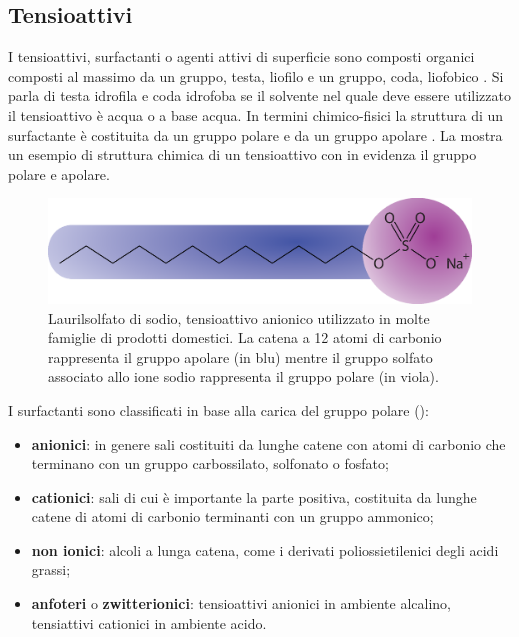 \subsection{Tensioattivi}
I tensioattivi, surfactanti o agenti attivi di superficie sono composti organici composti al massimo da un gruppo, testa, liofilo e un gruppo, coda, liofobico . Si parla di testa idrofila e coda idrofoba se il solvente nel quale deve essere utilizzato il tensioattivo è acqua o a base acqua. In termini chimico-fisici la struttura di un surfactante è costituita da un gruppo polare e da un gruppo apolare . La  mostra un esempio di struttura chimica di un tensioattivo con in evidenza il gruppo polare e apolare.

\begin{figure}[htbp]
    \centering
    \includegraphics[width=.8\textwidth]{fig/foamer/sls.eps}
    \caption{Laurilsolfato di sodio, tensioattivo anionico utilizzato in molte famiglie di prodotti domestici. La catena a 12 atomi di carbonio rappresenta il gruppo apolare (in blu) mentre il gruppo solfato associato allo ione sodio rappresenta il gruppo polare (in viola).}
    \label{fig:sls}
\end{figure}

I surfactanti sono classificati in base alla carica del gruppo polare ():
\begin{itemize}
    \item \textbf{anionici}: in genere sali costituiti da lunghe catene con atomi di carbonio che terminano con un gruppo carbossilato, solfonato o fosfato;
    \item \textbf{cationici}: sali di cui è importante la parte positiva, costituita da lunghe catene di atomi di carbonio terminanti con un gruppo ammonico;
    \item \textbf{non ionici}: alcoli a lunga catena, come i derivati poliossietilenici degli acidi grassi;
    \item \textbf{anfoteri} o \textbf{zwitterionici}: tensioattivi anionici in ambiente alcalino, tensiattivi cationici in ambiente acido.
\end{itemize}

